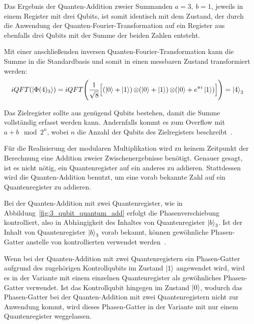 Das Ergebnis der Quanten-Addition zweier Summanden \(a=3,~b=1\), 
jeweils in einem Register mit drei Qubits,
ist somit identisch mit dem Zustand, 
der durch die Anwendung der Quanten-Fourier-Transformation auf ein Register 
aus ebenfalls drei Qubits mit der Summe der beiden Zahlen entsteht.

Mit einer anschließenden inversen Quanten-Fourier-Transformation 
kann die Summe in die Standardbasis und somit in einen messbaren Zustand transformiert werden:
\[
iQFT(\ket{\Phi(4)_3})
=
 iQFT \Bigg(\frac{1}{\sqrt{8}} \Big[ (\ket{0} + \ket{1} ) \operatorname{\otimes}
( \ket{0} +   \ket{1} ) \operatorname{\otimes}
( \ket{0} +  e^{\pi i }\ket{1} ) \Big]\Bigg) 
=
\ket{4}_3
\]

Das Zielregister sollte aus genügend Qubits bestehen, 
damit die Summe vollständig erfasst werden kann.
Andernfalls kommt es zum Overflow mit \(a + b \mod 2^n\), 
wobei \(n\) die Anzahl der Qubits des Zielregisters beschreibt~\cite{beauregard2003circuit}.

Für die Realisierung der modularen Multiplikation wird zu keinem Zeitpunkt der Berechnung eine Addition zweier Zwischenergebnisse benötigt. 
Genauer gesagt, ist es nicht nötig, ein Quantenregister auf ein anderes zu addieren. 
Stattdessen wird die Quanten-Addition benutzt, um eine vorab bekannte Zahl auf ein Quantenregister zu addieren.

Bei der Quanten-Addition mit zwei Quantenregister, 
wie in Abbildung~\ref{fig:3_qubit_quantum_add} erfolgt die Phasenverschiebung kontrolliert,  
also in Abhängigkeit des Inhaltes von Quantenregister \(\ket{b}_3\).
Ist der Inhalt von Quantenregister \(\ket{b}_3\) vorab bekannt,
können gewöhnliche Phasen-Gatter anstelle von kontrollierten verwendet werden~\cite{beauregard2003circuit}.

Wenn bei der Quanten-Addition mit zwei Quantenregistern ein Phasen-Gatter aufgrund des zugehörigen Kontrollqubits im Zustand \(\ket{1}\) angewendet wird,
wird es in der Variante mit einem einzelnen Quantenregister als gewöhnliches Phasen-Gatter verwendet.
Ist das Kontrollqubit hingegen im Zustand \(\ket{0}\), 
wodurch das Phasen-Gatter bei der Quanten-Addition mit zwei Quantenregistern nicht zur Anwendung kommt, 
wird dieses Phasen-Gatter in der Variante mit nur einem Quantenregister weggelassen.

